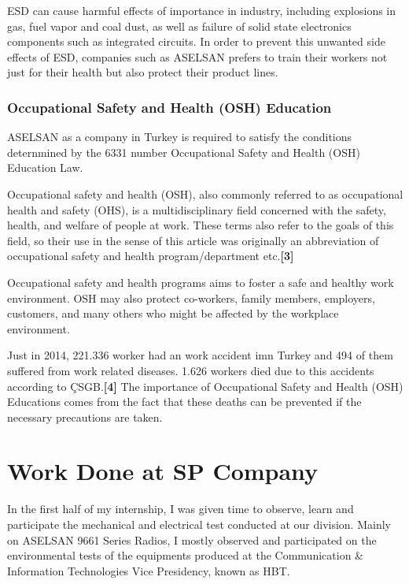 	ESD can cause harmful effects of importance in industry, including explosions in gas, fuel vapor and coal dust, as well as failure of solid state electronics components such as integrated circuits. In order to prevent this unwanted side effects of ESD, companies such as ASELSAN prefers to train their workers not just for their health but also protect their product lines. 


\subsubsection{Occupational Safety and Health (OSH) Education}
\- \indent

	ASELSAN as a company in Turkey is required to satisfy the conditions deternmined by the 6331 number Occupational Safety and Health (OSH) Education Law. 
	
	Occupational safety and health (OSH), also commonly referred to as occupational health and safety (OHS), is a multidisciplinary field concerned with the safety, health, and welfare of people at work. These terms also refer to the goals of this field, so their use in the sense of this article was originally an abbreviation of occupational safety and health program/department etc.\textbf{[3]}

	Occupational safety and health programs aims to foster a safe and healthy work environment. OSH may also protect co-workers, family members, employers, customers, and many others who might be affected by the workplace environment. 

	Just in 2014, 221.336 worker had an work accident imn Turkey and 494 of them suffered from work related diseases. 1.626 workers died due to this accidents according to ÇSGB.\textbf{[4]} The importance of Occupational Safety and Health (OSH) Educations comes from the fact that these deaths can be prevented if the necessary precautions are taken.

\section{Work Done at SP Company}

	In the first half of my internship, I was given time to observe, learn and participate the mechanical and electrical test conducted at our division. Mainly on ASELSAN 9661 Series Radios, I mostly observed and participated on the environmental tests of the equipments produced at the Communication \& Information Technologies Vice Presidency, known as HBT.
	
